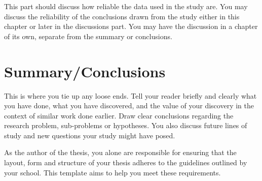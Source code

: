 \documentclass[english, 12pt, a4paper, elec, utf8, a-2b, online]{aaltothesis}
\begin{document}
This part should discuss how reliable the data used in the study are. You may 
discuss the reliability of the conclusions drawn from the study either in this 
chapter or later in the discussions part. You may have the discussion in a 
chapter of its own, separate from the summary or conclusions.


\clearpage

\section{Summary/Conclusions}
\label{sec:summary}

This is where you tie up any loose ends. Tell your reader briefly and clearly 
what you have done, what you have discovered, and the value of your discovery 
in the context of similar work done earlier. Draw clear conclusions regarding 
the research problem, sub-problems or hypotheses. You also discuss future lines 
of study and new questions your study might have posed.

As the author of the thesis, you alone are responsible for ensuring that the 
layout, form and structure of your thesis adheres to the guidelines outlined by 
your school. This template aims to help you meet these requirements.



\clearpage
\thesisbibliography
\end{document}
